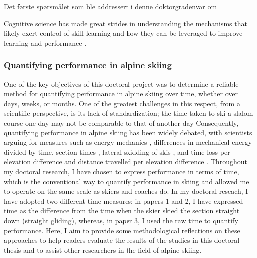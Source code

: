 Det første spørsmålet som ble addressert i denne doktorgradenvar om 



Cognitive science has made great strides in understanding the mechanisms that likely exert control of skill learning and how they can be leveraged to improve learning and performance \cite{wolpert_principles_2011, makino_circuit_2016, spampinato_multiple_2021, krakauer_motor_2019, haith_model-based_2013, huang_rethinking_2011, shmuelof_are_2011, doya_complementary_2000}. 






\subsubsection{Quantifying performance in alpine skiing}
One of the key objectives of this doctoral project was to determine a reliable method for quantifying performance in alpine skiing over time, whether over days, weeks, or months. One of the greatest challenges in this respect, from a scientific perspective, is its lack of standardization; the time taken to ski a slalom course one day may not be comparable to that of another day  Consequently, quantifying performance in alpine skiing has been widely debated, with scientists arguing for measures such as energy mechanics \cite{supej_differential_2008, supej_how_2010, supej_mechanical_2011} , differences in mechanical energy divided by time, section times \cite{supej_relations_2006}, lateral skidding of skis \cite{kirby_development_2009}, and time loss per elevation difference and distance travelled per elevation difference \cite{federolf_quantifying_2012}. Throughout my doctoral research, I have chosen to express performance in terms of time, which is the conventional way to quantify performance in skiing and allowed me to operate on the same scale as skiers and coaches do. In my doctoral reseach, I have adopted two different time measures: in papers 1 and 2, I have expressed time as the difference from the time when the skier skied the section straight down (straight gliding), whereas, in paper 3, I used the raw time to quantify performance. Here, I aim to provide some methodological reflections on these approaches to help readers evaluate the results of the studies in this doctoral thesis and to assist other researchers in the field of alpine skiing. 

